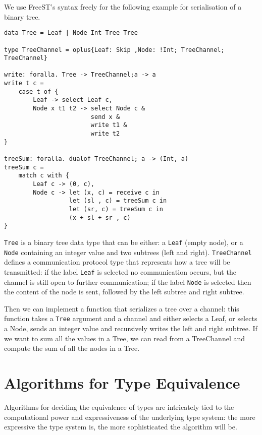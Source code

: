 We use FreeST's syntax freely for the following example for serialisation of a binary tree.

\begin{lstlisting}
data Tree = Leaf | Node Int Tree Tree

type TreeChannel = oplus{Leaf: Skip ,Node: !Int; TreeChannel; TreeChannel}

write: foralla. Tree -> TreeChannel;a -> a
write t c = 
    case t of { 
        Leaf -> select Leaf c, 
        Node x t1 t2 -> select Node c & 
                        send x &  
                        write t1 & 
                        write t2
}

treeSum: foralla. dualof TreeChannel; a -> (Int, a) 
treeSum c = 
    match c with { 
        Leaf c -> (0, c), 
        Node c -> let (x, c) = receive c in
                  let (sl , c) = treeSum c in
                  let (sr, c) = treeSum c in
                  (x + sl + sr , c)
}

\end{lstlisting}

\lstinline{Tree} is a binary tree data type that can be either: a \lstinline{Leaf} (empty node), or a \lstinline{Node} containing an integer value and two subtrees (left and right). \lstinline{TreeChannel} defines a communication protocol type that represents how a tree will be transmitted: if the label \lstinline{Leaf} is selected no communication occurs, but the channel is still open to further communication; if the label \lstinline{Node} is selected then the content of the node is sent, followed by the left subtree and right subtree. 

Then we can implement a function that serializes a tree over a channel: this function takes a \lstinline{Tree} argument and a channel and either selects a Leaf, or selects a Node, sends an integer value and recursively writes the left and right subtree. If we want to sum all the values in a Tree, we can read from a TreeChannel and compute the sum of all the nodes in a Tree. 



\section{Algorithms for Type Equivalence}
Algorithms for deciding the equivalence of types are intricately tied to the computational power and expressiveness of the underlying type system: the more expressive the type system is, the more sophisticated the algorithm will be.

